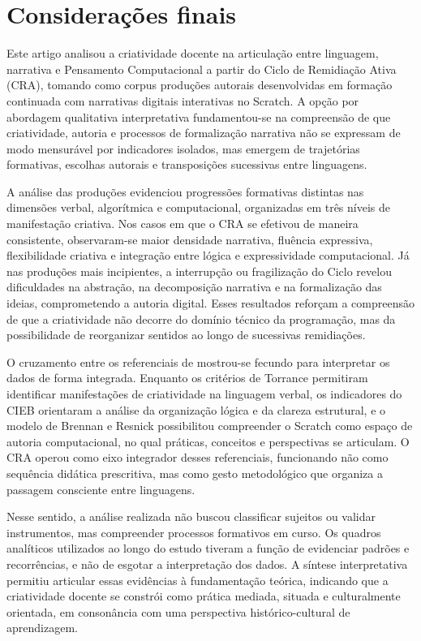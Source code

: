 \documentclass[portuguese]{textolivre}
\begin{document}
\section{Considerações finais}\label{sec-conclusoes}

Este artigo analisou a criatividade docente na articulação entre linguagem, narrativa e Pensamento Computacional a partir do Ciclo de Remidiação Ativa (CRA), tomando como corpus produções autorais desenvolvidas em formação continuada com narrativas digitais interativas no Scratch. A opção por abordagem qualitativa interpretativa fundamentou-se na compreensão de que criatividade, autoria e processos de formalização narrativa não se expressam de modo mensurável por indicadores isolados, mas emergem de trajetórias formativas, escolhas autorais e transposições sucessivas entre linguagens.

A análise das produções evidenciou progressões formativas distintas nas dimensões verbal, algorítmica e computacional, organizadas em três níveis de manifestação criativa. Nos casos em que o CRA se efetivou de maneira consistente, observaram-se maior densidade narrativa, fluência expressiva, flexibilidade criativa e integração entre lógica e expressividade computacional. Já nas produções mais incipientes, a interrupção ou fragilização do Ciclo revelou dificuldades na abstração, na decomposição narrativa e na formalização das ideias, comprometendo a autoria digital. Esses resultados reforçam a compreensão de que a criatividade não decorre do domínio técnico da programação, mas da possibilidade de reorganizar sentidos ao longo de sucessivas remidiações.

O cruzamento entre os referenciais de \textcite{torrance1995,brennan2012,cieb2024} mostrou-se fecundo para interpretar os dados de forma integrada. Enquanto os critérios de Torrance permitiram identificar manifestações de criatividade na linguagem verbal, os indicadores do CIEB orientaram a análise da organização lógica e da clareza estrutural, e o modelo de Brennan e Resnick possibilitou compreender o Scratch como espaço de autoria computacional, no qual práticas, conceitos e perspectivas se articulam. O CRA operou como eixo integrador desses referenciais, funcionando não como sequência didática prescritiva, mas como gesto metodológico que organiza a passagem consciente entre linguagens.

Nesse sentido, a análise realizada não buscou classificar sujeitos ou validar instrumentos, mas compreender processos formativos em curso. Os quadros analíticos utilizados ao longo do estudo tiveram a função de evidenciar padrões e recorrências, e não de esgotar a interpretação dos dados. A síntese interpretativa permitiu articular essas evidências à fundamentação teórica, indicando que a criatividade docente se constrói como prática mediada, situada e culturalmente orientada, em consonância com uma perspectiva histórico-cultural de aprendizagem.
\end{document}
